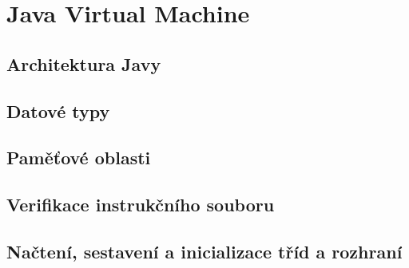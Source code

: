 \chapter{Java Virtual Machine}


\section{Architektura Javy}


\section{Datové typy}


\section{Paměťové oblasti}


\section{Verifikace instrukčního souboru}


\section{Načtení, sestavení a inicializace tříd a rozhraní}


